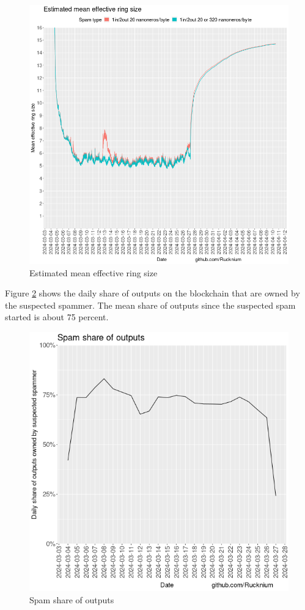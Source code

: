 \documentclass[usletter,11pt,english,openany]{article}
\begin{document}
\begin{figure}[H]
\caption{Estimated mean effective ring size}
\label{fig-estimated-mean-effective-ring-size}
\centering{}\includegraphics[scale=0.5]{images/empirical-effective-ring-size}
\end{figure}

Figure \ref{fig-spam-share-outputs} shows the daily share of outputs
on the blockchain that are owned by the suspected spammer. The mean
share of outputs since the suspected spam started is about 75 percent.

\begin{figure}[H]
\caption{Spam share of outputs}
\label{fig-spam-share-outputs}
\centering{}\includegraphics[scale=0.5]{images/spam-share-outputs}
\end{figure}
\end{document}
